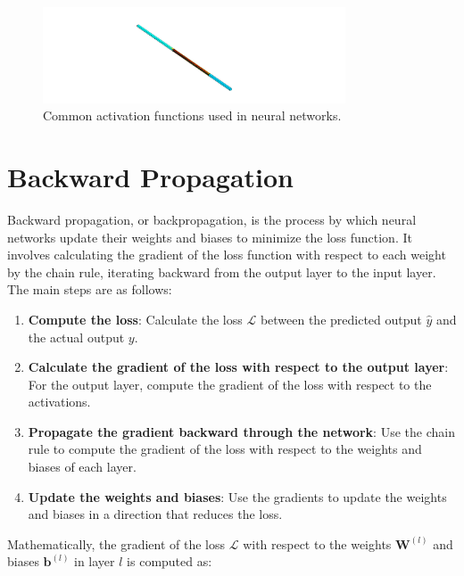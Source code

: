             \begin{figure}[h]
                \centering
                \includegraphics[width=0.8\textwidth]{00_Images/00_Velocity.png}
                \caption{Common activation functions used in neural networks.}
                \label{fig:activation_functions}
            \end{figure}

\section{Backward Propagation}

    Backward propagation, or backpropagation, is the process by which neural networks update their weights and biases to minimize the loss function. It involves calculating the gradient of the loss function with respect to each weight by the chain rule, iterating backward from the output layer to the input layer. The main steps are as follows:
    
    \begin{enumerate}
        \item \textbf{Compute the loss}: Calculate the loss \( \mathcal{L} \) between the predicted output \( \hat{y} \) and the actual output \( y \).
        \item \textbf{Calculate the gradient of the loss with respect to the output layer}: For the output layer, compute the gradient of the loss with respect to the activations.
        \item \textbf{Propagate the gradient backward through the network}: Use the chain rule to compute the gradient of the loss with respect to the weights and biases of each layer.
        \item \textbf{Update the weights and biases}: Use the gradients to update the weights and biases in a direction that reduces the loss.
    \end{enumerate}
    
    Mathematically, the gradient of the loss \( \mathcal{L} \) with respect to the weights \( \mathbf{W}^{(l)} \) and biases \( \mathbf{b}^{(l)} \) in layer \( l \) is computed as:
    
